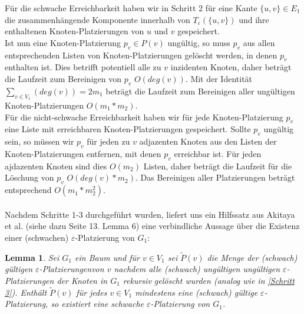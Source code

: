 \documentclass[a4paper, 12pt, twoside]{article}
\theoremstyle{Format1} %
\newtheorem{Lem}[Def]{Lemma}                %
\begin{document}
Für die schwache Erreichbarkeit haben wir in Schritt 2 für eine Kante $\{u,v\} \in E_1$ die zusammenhängende Komponente innerhalb von $T_{\varepsilon}(\{u,v\})$
und ihre enthaltenen Knoten-Platzierungen von $u$ und $v$ gespeichert.
\\
Ist nun eine Knoten-Platzierung $p_v \in P(v)$ ungültig, so muss $p_v$ aus allen entsprechenden Listen von Knoten-Platzierungen gelöscht werden, in
denen $p_v$ enthalten ist. Dies betrifft potentiell alle zu $v$ inzidenten Knoten, daher beträgt die Laufzeit zum Bereinigen von $p_v$ $O(deg(v))$.
Mit der Identität $\sum_{v \in V_1}(deg(v)) = 2m_1$ beträgt die Laufzeit zum Bereinigen aller ungültigen Knoten-Platzierungen $O(m_1*m_2)$.
\\
Für die nicht-schwache Erreichbarkeit haben wir für jede Knoten-Platzierung $p_v$ eine Liste mit erreichbaren Knoten-Platzierungen gespeichert.
Sollte $p_v$ ungültig sein, so müssen wir $p_v$ für jeden zu $v$ adjazenten Knoten aus den Listen der Knoten-Platzierungen entfernen, mit denen $p_v$ erreichbar ist.
Für jeden ajdazenten Knoten sind dies $O(m_2)$ Listen, daher beträgt die Laufzeit für die Löschung von $p_v$ $O(deg(v)*m_2)$.
Das Bereinigen aller Platzierungen beträgt entsprechend $O(m_1*m_2^2)$.
\\
\\
Nachdem Schritte 1-3 durchgeführt wurden, liefert uns ein Hilfssatz aus Akitaya et al. (siehe dazu Seite 13. Lemma 6) eine verbindliche Aussage über die Existenz
einer (schwachen) $\varepsilon$-Platzierung von $G_1$:

\begin{Lem} \label {Lemma 1}
	Sei $G_1$ ein Baum und für $v \in V_1$ sei $\tilde{P}(v)$ die Menge der (schwach) gültigen $\varepsilon$-Platzierungenvon $v$ nachdem
	alle (schwach) ungültigen ungültigen $\varepsilon$-Platzierungen der Knoten in $G_1$ rekursiv gelöscht wurden (analog wie in \ref{Schritt 3}).
	Enthält $\tilde{P}(v)$ für jedes $v \in V_1$ mindestens eine (schwach) gültige $\varepsilon$-Platzierung, so existiert
	eine schwache $\varepsilon$-Platzierung von $G_1$.
\end{Lem}
\end{document}

